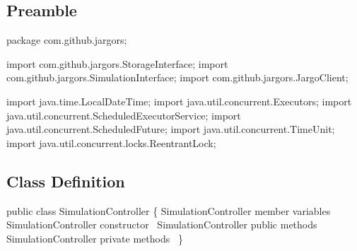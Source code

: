\documentclass{article}
\def\nwendcode{\endtrivlist \endgroup}
\let\nwdocspar=\par
\begin{document}
\subsection{Preamble}
\nwenddocs{}\endmoddef{}
package com.github.jargors;
\nwendcode{}\nwdocspar
\nwenddocs{}\plusendmoddef
import com.github.jargors.StorageInterface;
import com.github.jargors.SimulationInterface;
import com.github.jargors.JargoClient;
\nwendcode{}\nwdocspar
\nwenddocs{}\plusendmoddef
import java.time.LocalDateTime;
import java.util.concurrent.Executors;
import java.util.concurrent.ScheduledExecutorService;
import java.util.concurrent.ScheduledFuture;
import java.util.concurrent.TimeUnit;
import java.util.concurrent.locks.ReentrantLock;
\nwendcode{}\nwdocspar

\subsection{Class Definition}
\nwenddocs{}\endmoddef{}
public class SimulationController \{
  \LA{}\code{}SimulationController\edoc{} member variables~{\nwtagstyle{}}\RA{}
  \LA{}\code{}SimulationController\edoc{} constructor~{\nwtagstyle{}}\RA{}
  \LA{}\code{}SimulationController\edoc{} public methods~{\nwtagstyle{}}\RA{}
  \LA{}\code{}SimulationController\edoc{} private methods~{\nwtagstyle{}}\RA{}
\}
\nwendcode{}\nwdocspar
\end{document}
